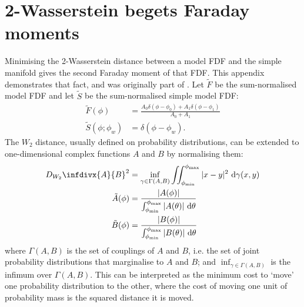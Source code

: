 \section{2-Wasserstein begets Faraday moments}
  \label{sec:faraday-w2-to-faraday-moments}
    Minimising the 2-Wasserstein distance between a model FDF and the simple manifold gives the second Faraday moment of that FDF. This appendix demonstrates that fact, and was originally part of \citet{alger2021interpretable}. Let $\tilde F$ be the sum-normalised model FDF and let $\tilde S$ be the sum-normalised simple model FDF:
    \begin{align}
      \tilde F(\phi) &= \frac{A_0 \delta(\phi - \phi_0) + A_1 \delta(\phi - \phi_1)}{A_0 + A_1}\\
      \tilde S(\phi; \phi_w) &= \delta(\phi - \phi_w).
    \end{align}
    The $W_2$ distance, usually defined on probability distributions, can be extended to one-dimensional complex functions $A$ and $B$ by normalising them:
      \begin{align}
        \label{eq:faraday-w2}
        D_{W_2}\infdivx{A}{B}^2 &= \inf_{\gamma \in \Gamma(A, B)} \iint_{\phi_{\min}}^{\phi_{\max}} |x - y|^2\ \mathrm{d}\gamma(x, y) \\
        \label{eq:faraday-normalised}
        \tilde A(\phi) &= \frac{|A(\phi)|}{\int_{\phi_{\min}}^{\phi_{\max}} |A(\theta)|\ \mathrm{d}\theta}\\
        \tilde B(\phi) &= \frac{|B(\phi)|}{\int_{\phi_{\min}}^{\phi_{\max}} |B(\theta)|\ \mathrm{d}\theta}
      \end{align}
      where $\Gamma(A, B)$ is the set of couplings of $A$ and $B$, i.e. the set of joint probability distributions that marginalise to $A$ and $B$; and $\inf_{\gamma \in \Gamma(A, B)}$ is the infimum over $\Gamma(A, B)$. This can be interpreted as the minimum cost to `move' one probability distribution to the other, where the cost of moving one unit of probability mass is the squared distance it is moved.

